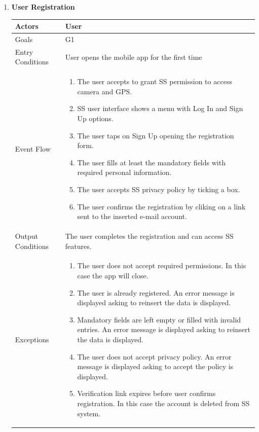 	\begin{enumerate}
	\item \textbf{User Registration}
		\begin{table}[h!]
		\begin{tabular}{|l|p{}|}
		\hline
		Actors            			&       	User\\ \hline
		Goals             			&         G1\\ \hline
		Entry Conditions  	&  		User opens the mobile app for the first time\\ \hline
		Event Flow        		&          
				\begin{enumerate}[label=\alph*)]
					\item The user accepts to grant SS permission to access camera and GPS.
					\item SS user interface shows a menu with Log In and Sign Up options.
					\item The user taps on Sign Up opening the registration form.
					\item The user fills at least the mandatory fields with required personal information.
					\item The user accepts SS privacy policy by ticking a box.
					\item The user confirms the registration by cliking on a link sent to the inserted e-mail account.
				\end{enumerate}\\ \hline
		Output Conditions &    		The user completes the registration and can access SS features.	\\ \hline
		Exceptions        		&       	
				\begin{enumerate}[label=\alph*)]
					\item The user does not accept required permissions. In this case the app will close.
					\item The user is already registered. An error message is displayed asking to reinsert the data is displayed.
					\item Mandatory fields are left empty or filled with invalid entries. An error message is displayed asking to reinsert the data is displayed.
					\item The user does not accept privacy policy. An error message is displayed asking to accept the policy is displayed.
					\item Verification link expires before user confirms registration. In this case the account is deleted from SS system.
				\end{enumerate}\\ \hline
	\end{tabular}
	\end{table}
	

\end{enumerate}
